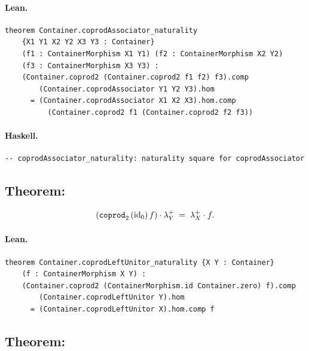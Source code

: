 \documentclass[11pt,a4paper]{article}
\begin{document}
\paragraph{Lean.}
\begin{lstlisting}[style=lean]
theorem Container.coprodAssociator_naturality
    {X1 Y1 X2 Y2 X3 Y3 : Container}
    (f1 : ContainerMorphism X1 Y1) (f2 : ContainerMorphism X2 Y2)
    (f3 : ContainerMorphism X3 Y3) :
    (Container.coprod2 (Container.coprod2 f1 f2) f3).comp
        (Container.coprodAssociator Y1 Y2 Y3).hom
      = (Container.coprodAssociator X1 X2 X3).hom.comp
          (Container.coprod2 f1 (Container.coprod2 f2 f3))
\end{lstlisting}

\paragraph{Haskell.}
\begin{lstlisting}[style=haskell]
-- coprodAssociator_naturality: naturality square for coprodAssociator
\end{lstlisting}


\subsection{Theorem: }

\begin{thm}
\[
  (\texttt{coprod}_2\,(\mathrm{id}_0)\,f) \cdot \lambda^+_Y
  \;=\;
  \lambda^+_X \cdot f.
\]
\end{thm}

\paragraph{Lean.}
\begin{lstlisting}[style=lean]
theorem Container.coprodLeftUnitor_naturality {X Y : Container}
    (f : ContainerMorphism X Y) :
    (Container.coprod2 (ContainerMorphism.id Container.zero) f).comp
        (Container.coprodLeftUnitor Y).hom
      = (Container.coprodLeftUnitor X).hom.comp f
\end{lstlisting}


\subsection{Theorem: }
\end{document}
